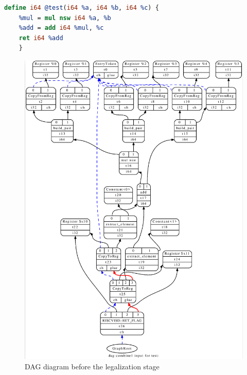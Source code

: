 \begin{lstlisting}[caption={IR code input for legalization example}, label={lst:ir_legalization}, language=llvm, style=nasm]
  define i64 @test(i64 %a, i64 %b, i64 %c) {
    %mul = mul nsw i64 %a, %b
    %add = add i64 %mul, %c
    ret i64 %add
    }
  \end{lstlisting}

\begin{figure}
  \centering
  \includegraphics[scale=0.5]{the_llvm_compiler/dag_before_legalization.png}
  \caption{DAG diagram before the legalization stage}
  \label{fig:dag_before_legalization}
\end{figure}

